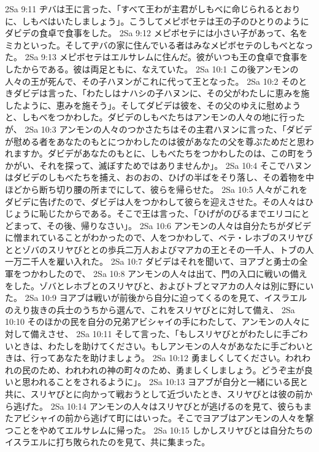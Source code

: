 2Sa 9:11  ヂバは王に言った、「すべて王わが主君がしもべに命じられるとおりに、しもべはいたしましょう」。こうしてメピボセテは王の子のひとりのようにダビデの食卓で食事をした。
2Sa 9:12  メピボセテには小さい子があって、名をミカといった。そしてヂバの家に住んでいる者はみなメピボセテのしもべとなった。
2Sa 9:13  メピボセテはエルサレムに住んだ。彼がいつも王の食卓で食事をしたからである。彼は両足ともに、なえていた。
2Sa 10:1  この後アンモンの人々の王が死んで、その子ハヌンがこれに代って王となった。
2Sa 10:2  そのときダビデは言った、「わたしはナハシの子ハヌンに、その父がわたしに恵みを施したように、恵みを施そう」。そしてダビデは彼を、その父のゆえに慰めようと、しもべをつかわした。ダビデのしもべたちはアンモンの人々の地に行ったが、
2Sa 10:3  アンモンの人々のつかさたちはその主君ハヌンに言った、「ダビデが慰める者をあなたのもとにつかわしたのは彼があなたの父を尊ぶためだと思われますか。ダビデがあなたのもとに、しもべたちをつかわしたのは、この町をうかがい、それを探って、滅ぼすためではありませんか」。
2Sa 10:4  そこでハヌンはダビデのしもべたちを捕え、おのおの、ひげの半ばをそり落し、その着物を中ほどから断ち切り腰の所までにして、彼らを帰らせた。
2Sa 10:5  人々がこれをダビデに告げたので、ダビデは人をつかわして彼らを迎えさせた。その人々はひじょうに恥じたからである。そこで王は言った、「ひげがのびるまでエリコにとどまって、その後、帰りなさい」。
2Sa 10:6  アンモンの人々は自分たちがダビデに憎まれていることがわかったので、人をつかわして、ベテ・レホブのスリヤびととゾバのスリヤびととの歩兵二万人およびマアカの王とその一千人、トブの人一万二千人を雇い入れた。
2Sa 10:7  ダビデはそれを聞いて、ヨアブと勇士の全軍をつかわしたので、
2Sa 10:8  アンモンの人々は出て、門の入口に戦いの備えをした。ゾバとレホブとのスリヤびと、およびトブとマアカの人々は別に野にいた。
2Sa 10:9  ヨアブは戦いが前後から自分に迫ってくるのを見て、イスラエルのえり抜きの兵士のうちから選んで、これをスリヤびとに対して備え、
2Sa 10:10  そのほかの民を自分の兄弟アビシャイの手にわたして、アンモンの人々に対して備えさせ、
2Sa 10:11  そして言った、「もしスリヤびとがわたしに手ごわいときは、わたしを助けてください。もしアンモンの人々があなたに手ごわいときは、行ってあなたを助けましょう。
2Sa 10:12  勇ましくしてください。われわれの民のため、われわれの神の町々のため、勇ましくしましょう。どうぞ主が良いと思われることをされるように」。
2Sa 10:13  ヨアブが自分と一緒にいる民と共に、スリヤびとに向かって戦おうとして近づいたとき、スリヤびとは彼の前から逃げた。
2Sa 10:14  アンモンの人々はスリヤびとが逃げるのを見て、彼らもまたアビシャイの前から逃げて町にはいった。そこでヨアブはアンモンの人々を撃つことをやめてエルサレムに帰った。
2Sa 10:15  しかしスリヤびとは自分たちのイスラエルに打ち敗られたのを見て、共に集まった。
